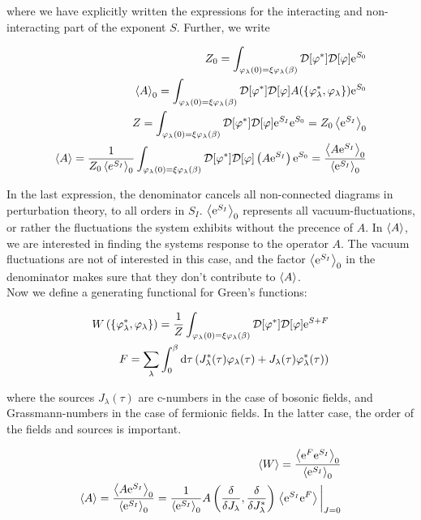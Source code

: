 where we have explicitly written the expressions for the interacting and non-interacting part of the exponent $S$. Further, we write 

\begin{align*}
    Z_0 = \int_{\varphi_\lambda(0) = \xi \varphi_\lambda(\beta)} \mathcal{D} [\varphi^*] \mathcal{D}[\varphi]\mathrm{e}^{S_0} \\ 
    \expval{A}_0 = \int_{\varphi_\lambda(0) = \xi \varphi_\lambda(\beta)} \mathcal{D} [\varphi^*] \mathcal{D}[\varphi]A(\{\varphi_\lambda^*, \varphi_\lambda\})\mathrm{e}^{S_0} \\ 
    Z = \int_{\varphi_\lambda(0) = \xi \varphi_\lambda(\beta)} \mathcal{D} [\varphi^*] \mathcal{D}[\varphi]\mathrm{e}^{S_I}\mathrm{e}^{S_0} = Z_0 \expval{\mathrm{e}^{S_I}}_0 \\ 
    \expval{A} = \frac{1}{Z_0 \expval{e^{S_I}}_0} \int_{\varphi_\lambda(0) = \xi \varphi_\lambda(\beta)} \mathcal{D} [\varphi^*] \mathcal{D}[\varphi]\left( A\mathrm{e}^{S_I} \right)\mathrm{e}^{S_0} = \frac{\expval{A\mathrm{e}^{S_I}}_0}{\expval{\mathrm{e}^{S_I}}_0}
\end{align*}

In the last expression, the denominator cancels all non-connected diagrams in perturbation theory, to all orders in $S_I$. $\expval{\mathrm{e}^{S_I}}_0$ represents all vacuum-fluctuations, or rather the fluctuations the system exhibits without the precence of $A$. In $\expval{A}$, we are interested in finding the systems response to the operator $A$. The vacuum fluctuations are not of interested in this case, and the factor $\expval{\mathrm{e}^{S_I}}_0$ in the denominator makes sure that they don't contribute to $\expval{A}$. \\ 

Now we define a generating functional for Green's functions: 

\begin{align*}
    W\left(\{\varphi_\lambda^*, \varphi_\lambda\}\right) = \frac{1}{Z}\int_{\varphi_\lambda(0) = \xi \varphi_\lambda(\beta)} \mathcal{D} [\varphi^*] \mathcal{D}[\varphi]\mathrm{e}^{S + F} \\ 
    F = \sum_\lambda \int_{0}^{\beta} \dd \tau \left( J_\lambda ^*(\tau)\varphi_\lambda(\tau) + J_\lambda (\tau)\varphi_\lambda ^*(\tau) \right)
\end{align*}

where the sources $J_\lambda(\tau)$ are c-numbers in the case of bosonic fields, and Grassmann-numbers in the case of fermionic fields. In the latter case, the order of the fields and sources is important. 

\begin{align*}
    \expval{W}= \frac{\expval{\e^F\e^{S_I}}_0}{\expval{\e^{S_I}}_0} \\ 
    \expval{A} = \frac{\expval{A\e^{S_I}}_0}{\expval{\e^{S_I}}_0} = \frac{1}{\expval{\e^{S_I}}_0} A\left( \fdv{}{J_\lambda }, \fdv{}{J_\lambda ^*} \right) \eval{\expval{\e^{S_I} \e^F}}_{J = 0}
\end{align*}

